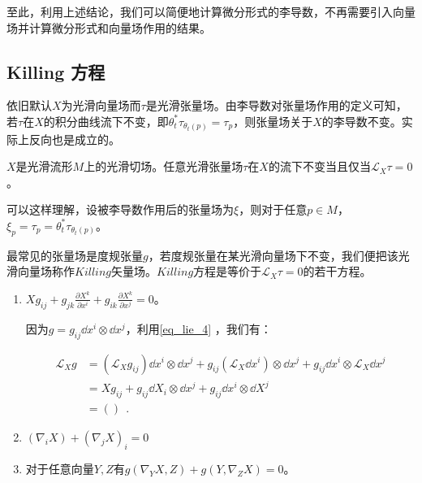 至此，利用上述结论，我们可以简便地计算微分形式的李导数，不再需要引入向量场并计算微分形式和向量场作用的结果。
\subsection{Killing 方程}
依旧默认$X$为光滑向量场而$\tau$是光滑张量场。由李导数对张量场作用的定义可知，若$\tau$在$X$的积分曲线流下不变，即$\theta_t^*\tau_{\theta_t(p)}=\tau_p$，则张量场关于$X$的李导数不变。实际上反向也是成立的。

\begin{theorem}{}
$X$是光滑流形$M$上的光滑切场。任意光滑张量场$\tau$在$X$的流下不变当且仅当$\mathcal L_X\tau=0$。
\end{theorem}
可以这样理解，设被李导数作用后的张量场为$\xi$，则对于任意$p\in M$，$\xi_p=\tau_p=\theta_t^*\tau_{\theta_t(p)}$。

最常见的张量场是度规张量$g$，若度规张量在某光滑向量场下不变，我们便把该光滑向量场称作$Killing$矢量场。$Killing$方程是等价于$\mathcal L_X\tau=0$的若干方程。
\begin{enumerate}
\item $Xg_{ij}+g_{jk}\frac{\partial X^k}{\partial x^i}+g_{ik}\frac{\partial X^k}{\partial x^j}=0$。

因为$g=g_{ij}\dd x^i\otimes\dd x^j$，利用\autoref{eq_lie_4} ，我们有：

\begin{equation}
\begin{aligned}
\mathcal L_X g&=(\mathcal L_Xg_{ij})\dd x^i\otimes \dd x^j+
g_{ij}(\mathcal L_X\dd x^i)\otimes\dd x^j+g_{ij}\dd x^i\otimes \mathcal L_X\dd x^j\\
&= Xg_{ij}+g_{ij}\dd X_i\otimes \dd x^j+g_{ij}\dd x^i\otimes \dd X^j\\
&=()\
~.
\end{aligned}
\end{equation}

\item $(\nabla_iX)+(\nabla_j X)_i=0$
\item 对于任意向量$Y,Z$有$g\left(\nabla_YX,Z\right)+g\left(Y,\nabla_ZX\right)=0$。
\end{enumerate}
